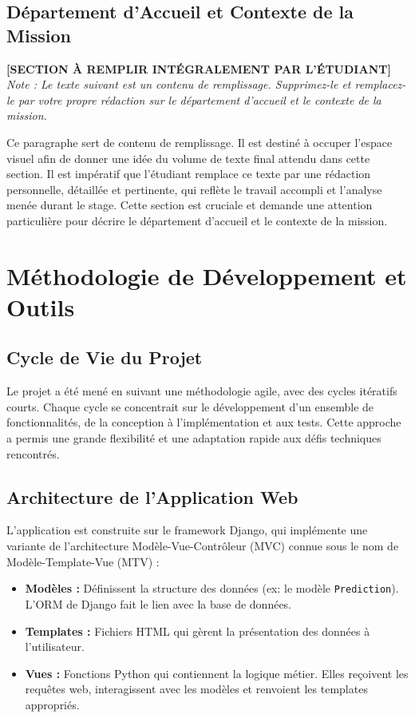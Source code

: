 \documentclass[12pt, a4paper]{report}
\begin{document}
\section{Département d'Accueil et Contexte de la Mission}
\textbf{[SECTION À REMPLIR INTÉGRALEMENT PAR L'ÉTUDIANT]}
\newline
\textit{Note : Le texte suivant est un contenu de remplissage. Supprimez-le et remplacez-le par votre propre rédaction sur le département d'accueil et le contexte de la mission.}

Ce paragraphe sert de contenu de remplissage. Il est destiné à occuper l'espace visuel afin de donner une idée du volume de texte final attendu dans cette section. Il est impératif que l'étudiant remplace ce texte par une rédaction personnelle, détaillée et pertinente, qui reflète le travail accompli et l'analyse menée durant le stage. Cette section est cruciale et demande une attention particulière pour décrire le département d'accueil et le contexte de la mission.

\chapter{Méthodologie de Développement et Outils}
\section{Cycle de Vie du Projet}
Le projet a été mené en suivant une méthodologie agile, avec des cycles itératifs courts. Chaque cycle se concentrait sur le développement d'un ensemble de fonctionnalités, de la conception à l'implémentation et aux tests. Cette approche a permis une grande flexibilité et une adaptation rapide aux défis techniques rencontrés.

\section{Architecture de l'Application Web}
L'application est construite sur le framework Django, qui implémente une variante de l'architecture Modèle-Vue-Contrôleur (MVC) connue sous le nom de Modèle-Template-Vue (MTV) :
\begin{itemize}
    \item \textbf{Modèles :} Définissent la structure des données (ex: le modèle \texttt{Prediction}). L'ORM de Django fait le lien avec la base de données.
    \item \textbf{Templates :} Fichiers HTML qui gèrent la présentation des données à l'utilisateur.
    \item \textbf{Vues :} Fonctions Python qui contiennent la logique métier. Elles reçoivent les requêtes web, interagissent avec les modèles et renvoient les templates appropriés.
\end{itemize}
\end{document}
